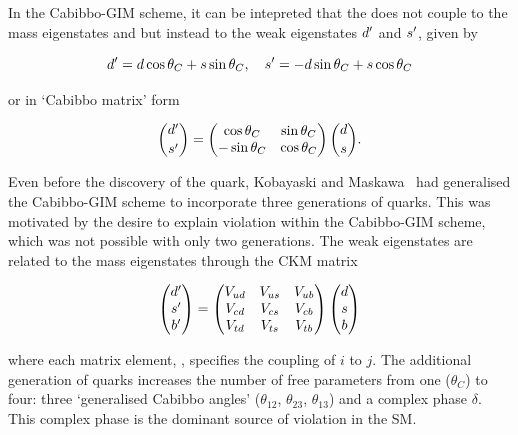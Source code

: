 In the Cabibbo-GIM scheme, it can be intepreted that the \W does not couple to the mass eigenstates \dquark and \squark but instead to the weak eigenstates ${d}^\prime$ and ${s}^\prime$, given by

\begin{equation}
{\ensuremath{d}}^\prime = {d}\cos\theta_{C}+{s}\sin\theta_{C},~~~{s}^\prime = -{d}\sin\theta_{C}+{s}\cos\theta_{C}
\end{equation}

\noindent or in `Cabibbo matrix' form

\begin{equation}
\binom{{d}^\prime}{{s}^\prime} = 
\begin{pmatrix}
\cos\theta_{C} & \sin\theta_{C} \\
-\sin\theta_{C} & \cos\theta_{C} \\
\end{pmatrix}
\binom{{d}}{{s}}.
\end{equation}

Even before the discovery of the \cquark quark, Kobayaski and Maskawa~\cite{kobayashi-maskawa} had generalised the Cabibbo-GIM scheme to incorporate three generations of quarks. This was motivated by the desire to explain \CP violation within the Cabibbo-GIM scheme, which was not possible with only two generations. The weak eigenstates are related to the mass eigenstates through the CKM matrix

\begin{equation}
\begin{pmatrix}
{\ensuremath{d}}^\prime \\
{s}^\prime \\
{b}^\prime \\
\end{pmatrix}
=
\begin{pmatrix}
{\ensuremath{V_{{u}{d}}}} & {V_{{u}{s}}} & {V_{{u}{b}}} \\
{V_{{c}{d}}} & {V_{{c}{s}}} & {V_{{c}{b}}} \\
{V_{{t}{d}}} & {V_{{t}{s}}} & {V_{{t}{b}}} \\
\end{pmatrix}
\begin{pmatrix}
{\ensuremath{d}} \\
{s} \\
{b} \\
\end{pmatrix}
\end{equation}

\noindent where each matrix element, \Vij, specifies the coupling of $i$ to $j$. The additional generation of quarks increases the number of free parameters from one ($\theta_{C}$) to four: three `generalised Cabibbo angles' ($\theta_{12}$, $\theta_{23}$, $\theta_{13}$) and a complex phase $\delta$. This complex phase is the dominant source of \CP violation in the SM. 

